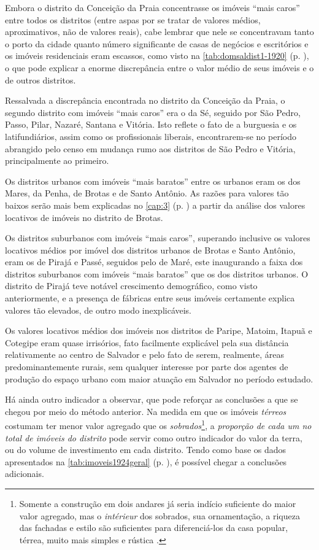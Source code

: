 

Embora o distrito da Conceição da Praia concentrasse os imóveis ``mais caros'' entre todos os distritos (entre aspas por se tratar de valores médios, aproximativos, não de valores reais), cabe lembrar que nele se concentravam tanto o porto da cidade quanto número significante de casas de negócios e escritórios e os imóveis residenciais eram escassos, como visto na \autoref{tab:domsaldist1-1920} (p. \pageref{tab:domsaldist1-1920}), o que pode explicar a enorme discrepância entre o valor médio de seus imóveis e o de outros distritos.

Ressalvada a discrepância encontrada no distrito da Conceição da Praia, o segundo distrito com imóveis ``mais caros'' era o da Sé, seguido por São Pedro, Passo, Pilar, Nazaré, Santana e Vitória. Isto reflete o fato de a burguesia e os latifundiários, assim como os profissionais liberais, encontrarem-se no período abrangido pelo censo em mudança rumo aos distritos de São Pedro e Vitória, principalmente ao primeiro.

Os distritos urbanos com imóveis ``mais baratos'' entre os urbanos eram os dos Mares, da Penha, de Brotas e de Santo Antônio. As razões para valores tão baixos serão mais bem explicadas no \autoref{cap:3} (p. \pageref{cap:3}) a partir da análise dos valores locativos de imóveis no distrito de Brotas.

Os distritos suburbanos com imóveis ``mais caros'', superando inclusive os valores locativos médios por imóvel dos distritos urbanos de Brotas e Santo Antônio, eram os de Pirajá e Passé, seguidos pelo de Maré, este inaugurando a faixa dos distritos suburbanos com imóveis ``mais baratos'' que os dos distritos urbanos. O distrito de Pirajá teve notável crescimento demográfico, como visto anteriormente, e a presença de fábricas entre seus imóveis certamente explica valores tão elevados, de outro modo inexplicáveis.

Os valores locativos médios dos imóveis nos distritos de Paripe, Matoim, Itapuã e Cotegipe eram quase irrisórios, fato facilmente explicável pela sua distância relativamente ao centro de Salvador e pelo fato de serem, realmente, áreas predominantemente rurais, sem qualquer interesse por parte dos agentes de produção do espaço urbano com maior atuação em Salvador no período estudado.

Há ainda outro indicador a observar, que pode reforçar as conclusões a que se chegou por meio do método anterior. Na medida em que os imóveis \textit{térreos} costumam ter menor valor agregado que os \textit{sobrados}\footnote{Somente a construção em dois andares já seria indício suficiente do maior valor agregado, mas o \textit{intérieur} dos sobrados, sua ornamentação, a riqueza das fachadas e estilo são suficientes para diferenciá-los da casa popular, térrea, muito mais simples e rústica \cite[pp.~87-111]{ott_formaet1_1955}.}, a \textit{proporção de cada um no total de imóveis do distrito} pode servir como outro indicador do valor da terra, ou do volume de investimento em cada distrito. Tendo como base os dados apresentados na \autoref{tab:imoveis1924geral} (p. \pageref{tab:imoveis1924geral}), é possível chegar a conclusões adicionais.

